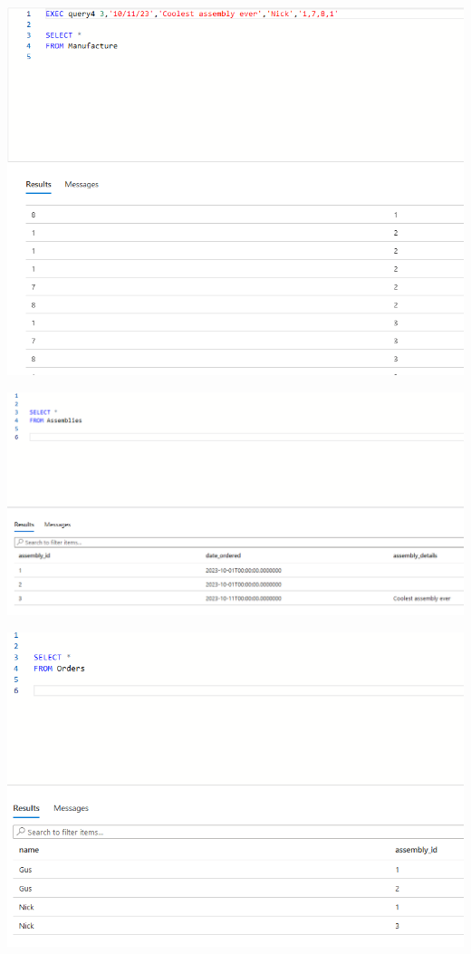 \documentclass[11pt]{article}
\begin{document}
\begin{enumerate}
\includegraphics[width = \textwidth]{insertAssembly2.png}

\includegraphics[width = \textwidth]{insertAssembly3.png}

\includegraphics[width = \textwidth]{insertAssembly4.png}


\end{enumerate}
\end{document}
